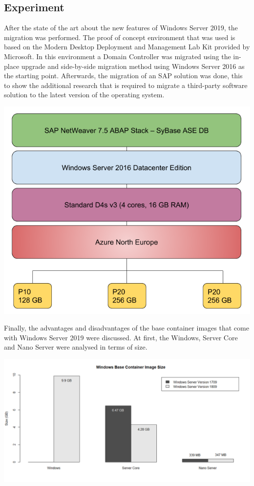 \documentclass[a0,portrait]{a0poster}
\begin{document}
\begin{multicols}{2}
\section*{Experiment}
\color{black}
After the state of the art about the new features of Windows Server 2019, the migration was performed.
The proof of concept environment that was used is based on the Modern Desktop Deployment and Management Lab Kit provided by Microsoft. 
In this environment a Domain Controller was migrated using the in-place upgrade and side-by-side migration method using Windows Server 2016 as the starting point.
Afterwards, the migration of an SAP solution was done, this to show the additional research that is required to migrate a third-party software solution to the latest version of the operating system. 
\begin{center}\vspace{0.1cm}
    \includegraphics[width=\linewidth]{../bachproef/img/Methodologie/SAP_PO}
\end{center}\vspace{0.1cm}
Finally, the advantages and disadvantages of the base container images that come with Windows Server 2019 were discussed.
At first, the Windows, Server Core and Nano Server were analysed in terms of size.
\begin{center}\vspace{0.1cm}
    \includegraphics[width=\linewidth]{../bachproef/img/Methodologie/Containers0}

\end{center}
\end{multicols}
\end{document}
